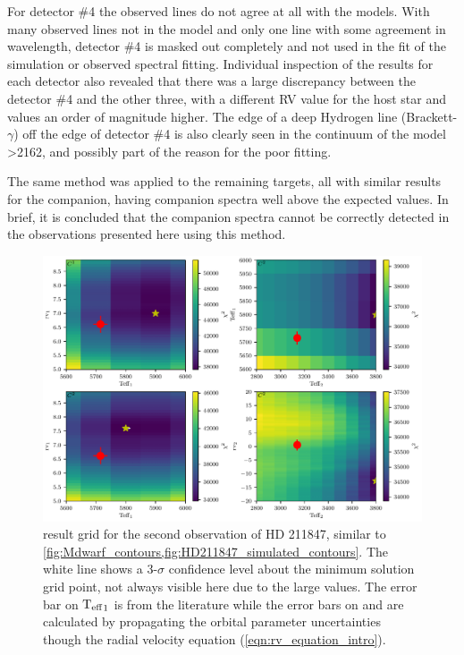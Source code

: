 For detector \#4 the observed lines do not agree at all with the models.
With many observed lines not in the model and only one line with some agreement in wavelength, detector \#4 is masked out completely and not used in the \textchisquared{} fit of the simulation or observed spectral fitting.
Individual inspection of the \textchisquared{} results for each detector also revealed that there was a large discrepancy between the detector \#4 and the other three, with a different {RV} value for the host star and \textchisquared{} values an order of magnitude higher.
The edge of a deep Hydrogen line (Brackett-\(\gamma\)) off the edge of detector \#4 is also clearly seen in the continuum of the model >2162\nm{}, and possibly part of the reason for the poor fitting.

The same method was applied to the remaining targets, all with similar results for the companion, having companion spectra well above the expected values.
In brief, it is concluded that the companion spectra cannot be correctly detected in the observations presented here using this method.


\begin{figure}
    \centering
    \includegraphics[width=0.8\linewidth]{figures/companion_recovery/HD211847_result_pcolors}
    \caption[\textchisquared{} contour for an observation {HD 211847}.]{\textchisquared{} result grid for the second observation of {HD 211847}, similar to \cref{fig:Mdwarf_contours,fig:HD211847_simulated_contours}.
        The white line shows a 3-\(\sigma\) confidence level about the minimum \textchisquared{} solution grid point, not always visible here due to the large \textchisquared{} values.
        The error bar on \({\textrm{T}_{\mathrm{eff}}}_{1}\) is from the literature while the error bars on \Rvone{} and \Rvtwo{} are calculated by propagating the orbital parameter uncertainties though the radial velocity equation (\cref{eqn:rv_equation_intro}).}
    \label{fig:HD211847_result_contours}
\end{figure}

